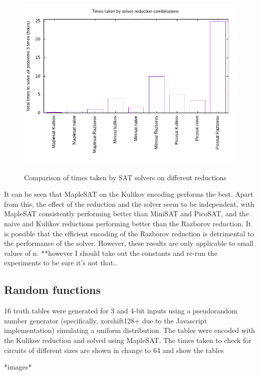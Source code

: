 \documentclass{article}
\begin{document}
\begin{figure}[!ht]
  \includegraphics[width=\textwidth]{images/totals.png}
  \label{fig:totals}
  \caption{Comparison of times taken by SAT solvers on different reductions}

\end{figure}

It can be seen that MapleSAT on the Kulikov encoding performs the best. Apart from this, the effect of the reduction and the solver seem to be independent, with MapleSAT consistently performing better than MiniSAT and PicoSAT, and the naive and Kulikov reductions performing better than the Razborov reduction. It is possible that the efficient encoding of the Razborov reduction is detrimental to the performance of the solver. However, these results are only applicable to small values of n. **however I should take out the constants and re-run the experiments to be sure it’s not that..

\subsection{Random functions}

16 truth tables were generated for 3 and 4-bit inputs using a pseudorandom number generator (specifically, xorshift128+ due to the Javascript implementation) simulating a uniform distribution. The tables were encoded with the Kulikov reduction and solved using MapleSAT. The times taken to check for circuits of different sizes are shown in
change to 64 and show the tables

*images*
\end{document}
